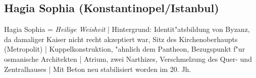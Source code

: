 \documentclass[emulatestandardclasses]{scrartcl}
\begin{document}
\subsection{Hagia Sophia (Konstantinopel/Istanbul)}
Hagia Sophia = \emph{Heilige Weisheit} | Hintergrund: Identit"atsbildung von Byzanz, da damaliger Kaiser nicht recht akzeptiert war, Sitz des Kirchenoberhaupts (Metropolit) | Kuppelkonstruktion, "ahnlich dem Pantheon, Bezugspunkt f"ur osmanische Architekten | Atrium, zwei Narthizes, Verschmelzung des Quer- und Zentralhauses | Mit Beton neu stabilisiert worden im 20. Jh.





\end{document}
